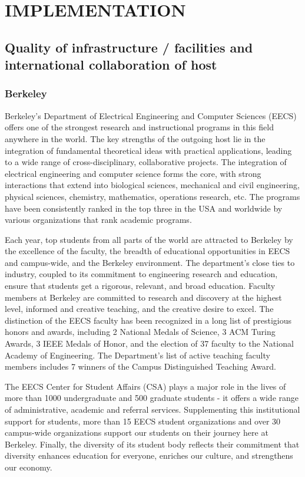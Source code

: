 \section{IMPLEMENTATION} %
\label{sec:implementation}
\subsection{Quality of infrastructure / facilities and international collaboration of host} 
\subsubsection{Berkeley}
Berkeley's Department of  Electrical Engineering and Computer Sciences
(EECS) offers one of the strongest research and instructional programs
in this field anywhere in the world. The key strengths of the outgoing
host  lie in  the integration  of fundamental  theoretical  ideas with
practical applications, leading to a wide range of cross-disciplinary,
collaborative projects. The  integration of electrical engineering and
computer science forms the  core, with strong interactions that extend
into biological  sciences, mechanical and  civil engineering, physical
sciences,  chemistry,  mathematics,   operations  research,  etc.  The
programs have been consistently ranked in the top three in the USA and
worldwide by various organizations that rank academic programs.

Each year, top  students from all parts of the  world are attracted to
Berkeley by the excellence of  the faculty, the breadth of educational
opportunities   in   EECS    and   campus-wide,   and   the   Berkeley
environment. The  department's close ties to industry,  coupled to its
commitment to engineering research and education, ensure that students
get  a rigorous,  relevant, and  broad education.  Faculty  members at
Berkeley are committed to research and discovery at the highest level,
informed and creative teaching, and  the creative desire to excel. The
distinction of the EECS faculty has  been recognized in a long list of
prestigious honors and awards, including 2 National Medals of Science,
3 ACM  Turing Awards, 3 IEEE Medals  of Honor, and the  election of 37
faculty to the National  Academy of Engineering. The Department's list
of active  teaching faculty members  includes 7 winners of  the Campus
Distinguished Teaching Award.

The EECS  Center for Student Affairs  (CSA) plays a major  role in the
lives of more  than 1000 undergraduate and 500  graduate students - it
offers  a   wide  range  of  administrative,   academic  and  referral
services. Supplementing this  institutional support for students, more
than   15  EECS   student  organizations   and  over   30  campus-wide
organizations  support   our  students   on  their  journey   here  at
Berkeley.  Finally, the  diversity of  its student  body  reflects their
commitment  that diversity enhances  education for  everyone, enriches
our culture, and strengthens our economy.

